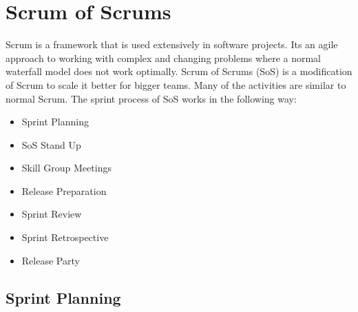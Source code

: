 \section{Scrum of Scrums}
Scrum is a framework that is used extensively in software projects.
Its an agile approach to working with complex and changing problems where a normal waterfall model does not work optimally.
Scrum of Scrums (SoS) is a modification of Scrum to scale it better for bigger teams.
Many of the activities are similar to normal Scrum.
The sprint process of SoS works in the following way:

\begin{itemize}
    \item Sprint Planning
    \item SoS Stand Up
    \item Skill Group Meetings
    \item Release Preparation
    \item Sprint Review
    \item Sprint Retrospective
    \item Release Party
\end{itemize}

\subsection{Sprint Planning}
